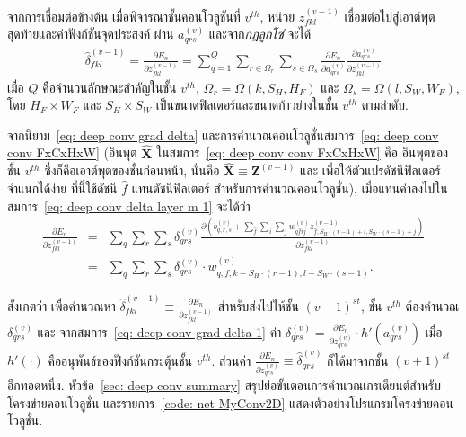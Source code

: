 จากการเชื่อมต่อข้างต้น
เมื่อพิจารณาชั้นคอนโวลูชั่นที่ $v^{th}$, 
หน่วย $z_{fkl}^{(v-1)}$ เชื่อมต่อไปสู่เอาต์พุตสุดท้ายและค่าฟังก์ชันจุดประสงค์
ผ่าน $a_{qrs}^{(v)}$ 
และจาก\textit{กฎลูกโซ่} จะได้
\begin{eqnarray}
\hat{\delta}_{fkl}^{(v-1)} = 
\frac{\partial E_n}{\partial z_{fkl}^{(v-1)}}
= \sum_{q=1}^Q \sum_{r \in \Omega_r} \sum_{s \in \Omega_s} \frac{\partial E_n}{\partial a_{qrs}^{(v)}}
\frac{\partial a_{qrs}^{(v)}}{\partial z_{fkl}^{(v-1)}}
\label{eq: deep conv delta layer m 1}
\end{eqnarray} 
เมื่อ $Q$ คือจำนวนลักษณะสำคัญในชั้น $v^{th}$,
$\Omega_r = \Omega(k, S_H, H_F)$ และ
$\Omega_s = \Omega(l, S_W, W_F)$,
โดย $H_F \times W_F$ และ $S_H \times S_W$
เป็นขนาดฟิลเตอร์และขนาดก้าวย่างในชั้น $v^{th}$ ตามลำดับ.

จากนิยาม~\ref{eq: deep conv grad delta} และการคำนวณคอนโวลูชั่นสมการ~\ref{eq: deep conv conv FxCxHxW} (อินพุต $\bm{\hat{X}}$ ในสมการ~\ref{eq: deep conv conv FxCxHxW} คือ อินพุตของชั้น $v^{th}$ ซึ่งก็คือเอาต์พุตของชั้นก่อนหน้า,
นั่นคือ $\bm{\hat{X}} \equiv \bm{Z}^{(v-1)}$
และ
เพื่อให้ตัวแปรดัชนีฟิลเตอร์จำแนกได้ง่าย 
ที่นี้ใช้ดัชนี $\hat{f}$ แทนดัชนีฟิลเตอร์ สำหรับการคำนวณคอนโวลูชั่น), เมื่อแทนค่าลงไปในสมการ~\ref{eq: deep conv delta layer m 1} จะได้ว่า
%
\begin{eqnarray}
\frac{\partial E_n}{\partial z_{fkl}^{(v-1)}}
&=& \sum_q \sum_r \sum_s \delta_{qrs}^{(v)}
\frac{\partial \left(b_{q,r,s}^{(v)} + \sum_{\hat{f}} \sum_i \sum_j w_{q\hat{f}ij}^{(v)} z_{\hat{f}, S_H \cdot (r - 1) + i, S_W \cdot (s - 1) + j}^{(v-1)} \right)}{\partial z_{fkl}^{(v-1)}}
\nonumber \\
&=&
\sum_q \sum_r \sum_s \delta_{qrs}^{(v)}
\cdot
w_{q,f,k-S_H \cdot (r - 1),l-S_W \cdot (s - 1)}^{(v)}
\label{eq: deep conv delta layer m 3} .
\end{eqnarray} 

สังเกตว่า เพื่อคำนวณหา $\hat{\delta}_{fkl}^{(v-1)} \equiv \frac{\partial E_n}{\partial z_{fkl}^{(v-1)}}$ สำหรับส่งไปให้ชั้น $(v-1)^{st}$,
ชั้น $v^{th}$ ต้องคำนวณ $\delta_{qrs}^{(v)}$
และ จากสมการ~\ref{eq: deep conv grad delta 1} ค่า
$\delta_{qrs}^{(v)} = \frac{\partial E_n}{\partial z_{qrs}^{(v)}} \cdot h'\left(a_{qrs}^{(v)}\right)$ เมื่อ $h'(\cdot)$ คืออนุพันธ์ของฟังก์ชันกระตุ้นชั้น $v^{th}$.
ส่วนค่า $\frac{\partial E_n}{\partial z_{qrs}^{(v)}} \equiv \hat{\delta}_{qrs}^{(v)}$ ก็ได้มาจากชั้น $(v+1)^{st}$ อีกทอดหนึ่ง.
หัวข้อ~\ref{sec: deep conv summary}
สรุปย่อขั้นตอนการคำนวณเกรเดียนต์สำหรับโครงข่ายคอนโวลูชั่น
และรายการ~\ref{code: net MyConv2D} %
แสดงตัวอย่างโปรแกรมโครงข่ายคอนโวลูชั่น.


